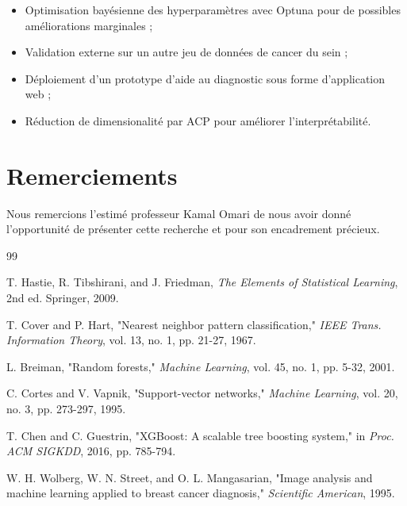 \documentclass[conference]{IEEEtran}
\begin{document}
\begin{itemize}
\item Optimisation bayésienne des hyperparamètres avec Optuna pour de possibles améliorations marginales ;
\item Validation externe sur un autre jeu de données de cancer du sein ;
\item Déploiement d'un prototype d'aide au diagnostic sous forme d'application web ;
\item Réduction de dimensionalité par ACP pour améliorer l'interprétabilité.
\end{itemize}

\section*{Remerciements}

Nous remercions l'estimé professeur Kamal Omari de nous avoir donné l'opportunité de présenter cette recherche et pour son encadrement précieux.

\begin{thebibliography}{99}

 T. Hastie, R. Tibshirani, and J. Friedman, \textit{The Elements of Statistical Learning}, 2nd ed. Springer, 2009.

 T. Cover and P. Hart, "Nearest neighbor pattern classification," \textit{IEEE Trans. Information Theory}, vol. 13, no. 1, pp. 21-27, 1967.

 L. Breiman, "Random forests," \textit{Machine Learning}, vol. 45, no. 1, pp. 5-32, 2001.

 C. Cortes and V. Vapnik, "Support-vector networks," \textit{Machine Learning}, vol. 20, no. 3, pp. 273-297, 1995.

 T. Chen and C. Guestrin, "XGBoost: A scalable tree boosting system," in \textit{Proc. ACM SIGKDD}, 2016, pp. 785-794.

 W. H. Wolberg, W. N. Street, and O. L. Mangasarian, "Image analysis and machine learning applied to breast cancer diagnosis," \textit{Scientific American}, 1995.

\end{thebibliography}
\end{document}
